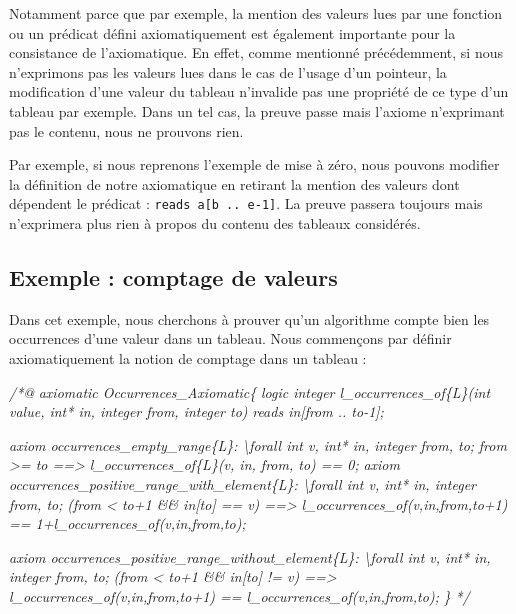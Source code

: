 \documentclass[12pt,francais,]{scrbook}
\newenvironment{Shaded}{}{}
\newcommand{\CommentTok}[1]{\textcolor[rgb]{0.38,0.63,0.69}{\textit{{#1}}}}
\begin{document}
Notamment parce que par exemple, la mention des valeurs lues par une
fonction ou un prédicat défini axiomatiquement est également importante
pour la consistance de l'axiomatique. En effet, comme mentionné
précédemment, si nous n'exprimons pas les valeurs lues dans le cas de
l'usage d'un pointeur, la modification d'une valeur du tableau
n'invalide pas une propriété de ce type d'un tableau par exemple. Dans
un tel cas, la preuve passe mais l'axiome n'exprimant pas le contenu,
nous ne prouvons rien.

Par exemple, si nous reprenons l'exemple de mise à zéro, nous pouvons
modifier la définition de notre axiomatique en retirant la mention des
valeurs dont dépendent le prédicat : \texttt{reads\ a{[}b\ ..\ e-1{]}}.
La preuve passera toujours mais n'exprimera plus rien à propos du
contenu des tableaux considérés.

\subsection{Exemple : comptage de
valeurs}\label{exemple-comptage-de-valeurs}

Dans cet exemple, nous cherchons à prouver qu'un algorithme compte bien
les occurrences d'une valeur dans un tableau. Nous commençons par
définir axiomatiquement la notion de comptage dans un tableau :

\begin{footnotesize}\begin{Shaded}
\begin{Highlighting}[]
\CommentTok{/*@}
\CommentTok{  axiomatic Occurrences_Axiomatic\{}
\CommentTok{    logic integer l_occurrences_of\{L\}(int value, int* in, integer from, integer to)}
\CommentTok{      reads in[from .. to-1];}

\CommentTok{    axiom occurrences_empty_range\{L\}:}
\CommentTok{      \textbackslash{}forall int v, int* in, integer from, to;}
\CommentTok{        from >= to ==> l_occurrences_of\{L\}(v, in, from, to) == 0;}
\CommentTok{    }
\CommentTok{    axiom occurrences_positive_range_with_element\{L\}:}
\CommentTok{      \textbackslash{}forall int v, int* in, integer from, to;}
\CommentTok{        (from < to+1 && in[to] == v) ==>}
\CommentTok{      l_occurrences_of(v,in,from,to+1) == 1+l_occurrences_of(v,in,from,to);}

\CommentTok{    axiom occurrences_positive_range_without_element\{L\}:}
\CommentTok{      \textbackslash{}forall int v, int* in, integer from, to;}
\CommentTok{        (from < to+1 && in[to] != v) ==>}
\CommentTok{      l_occurrences_of(v,in,from,to+1) == l_occurrences_of(v,in,from,to);}
\CommentTok{  \}}
\CommentTok{*/}
\end{Highlighting}
\end{Shaded}\end{footnotesize}
\end{document}

